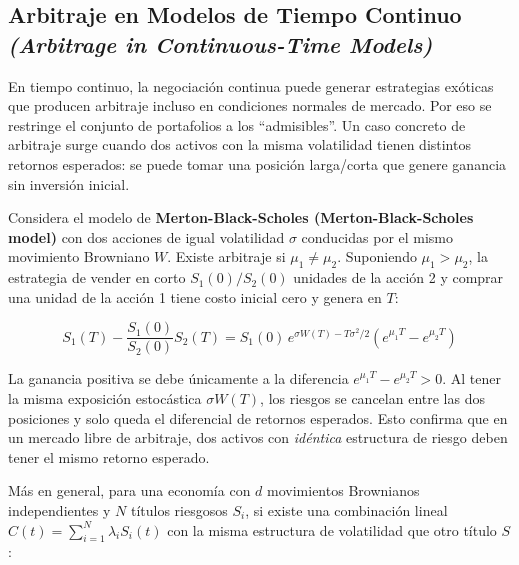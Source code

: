 \documentclass[12pt]{article}
\begin{document}
\subsection{Arbitraje en Modelos de Tiempo Continuo\\
\textit{(Arbitrage in Continuous-Time Models)}}

\begin{intuicion}
En tiempo continuo, la negociaci\'on continua puede generar estrategias ex\'oticas que producen arbitraje incluso en condiciones normales de mercado. Por eso se restringe el conjunto de portafolios a los ``admisibles''. Un caso concreto de arbitraje surge cuando dos activos con la misma volatilidad tienen distintos retornos esperados: se puede tomar una posici\'on larga/corta que genere ganancia sin inversi\'on inicial.
\end{intuicion}

Considera el modelo de \textbf{Merton-Black-Scholes (Merton-Black-Scholes model)} con dos acciones de igual volatilidad $\sigma$ conducidas por el mismo movimiento Browniano $W$. Existe arbitraje si $\mu_1 \ne \mu_2$. Suponiendo $\mu_1 > \mu_2$, la estrategia de vender en corto $S_1(0)/S_2(0)$ unidades de la acci\'on 2 y comprar una unidad de la acci\'on 1 tiene costo inicial cero y genera en $T$:

\begin{equation}
  S_1(T) - \frac{S_1(0)}{S_2(0)}S_2(T)
  = S_1(0)\,e^{\sigma W(T) - T\sigma^2/2}\!\left(e^{\mu_1 T} - e^{\mu_2 T}\right)
\end{equation}

\begin{intuicionmat}
La ganancia positiva se debe \'unicamente a la diferencia $e^{\mu_1 T} - e^{\mu_2 T} > 0$. Al tener la misma exposici\'on estoc\'astica $\sigma W(T)$, los riesgos se cancelan entre las dos posiciones y solo queda el diferencial de retornos esperados. Esto confirma que en un mercado libre de arbitraje, dos activos con \textit{id\'entica} estructura de riesgo deben tener el mismo retorno esperado.
\end{intuicionmat}

M\'as en general, para una econom\'ia con $d$ movimientos Brownianos independientes y $N$ t\'itulos riesgosos $S_i$, si existe una combinaci\'on lineal $C(t) = \sum_{i=1}^{N}\lambda_i S_i(t)$ con la misma estructura de volatilidad que otro t\'itulo $S$:
\end{document}
